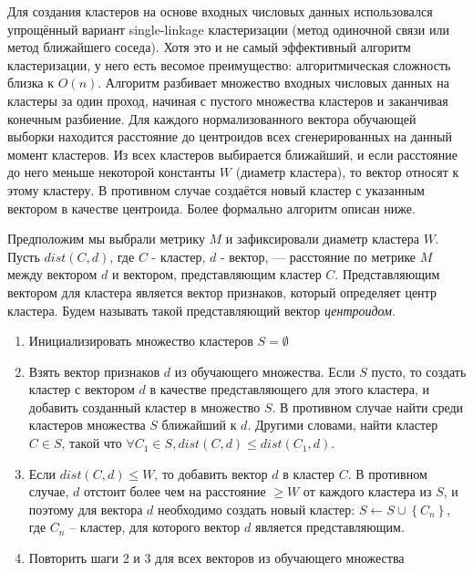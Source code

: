 \documentclass[12pt,a4paper]{article}
\begin{document}
Для создания кластеров на основе входных числовых данных использовался упрощённый вариант single-linkage
кластеризации (метод одиночной связи или метод ближайшего соседа). Хотя это и не самый эффективный алгоритм
кластеризации, у него есть весомое преимущество: алгоритмическая сложность близка к $O(n)$. Алгоритм
разбивает множество входных числовых данных на кластеры за один проход, начиная с пустого множества кластеров
и заканчивая конечным разбиение. Для каждого нормализованного вектора обучающей выборки находится расстояние до
центроидов всех сгенерированных на данный момент кластеров. Из всех кластеров выбирается ближайший, и если расстояние
до него меньше некоторой константы $W$ (диаметр кластера), то вектор относят к этому кластеру. В противном случае
создаётся новый кластер с указанным вектором в качестве центроида. Более формально алгоритм описан ниже.

Предположим мы выбрали метрику $M$ и зафиксировали диаметр кластера $W$. 
Пусть $dist(C, d)$, где $C$ - кластер, $d$ - вектор, --- расстояние по метрике
$M$ между вектором $d$ и вектором, представляющим кластер $C$.
Представляющим вектором для кластера является вектор признаков, который определяет
центр кластера. Будем называть такой представляющий вектор \textit{центроидом}.

\begin{enumerate}

\item Инициализировать множество кластеров $S = \emptyset $

\item Взять вектор признаков $d$ из обучающего множества. Если $S$ пусто, то создать
кластер с вектором $d$ в качестве представляющего для этого кластера, и добавить
созданный кластер в множество $S$. В противном случае найти среди кластеров
 множества $S$ ближайший к $d$. Другими словами, найти кластер $C \in S$, такой что 
 $\forall C_1 \in S, dist(C, d) \leq dist(C_1, d)$.
 
\item Если $dist(C, d) \leq W$, то добавить вектор $d$ в кластер $C$. В противном 
случае, $d$ отстоит более чем на расстояние $\geq W$ от каждого кластера из $S$,
и поэтому для вектора $d$ необходимо создать новый кластер: 
$S \longleftarrow S \cup \left\{C_n\right\}$, где $C_n$ -- кластер, для которого
вектор $d$ является представляющим.

\item Повторить шаги 2 и 3 для всех векторов из обучающего множества

\end{enumerate}
\end{document}
